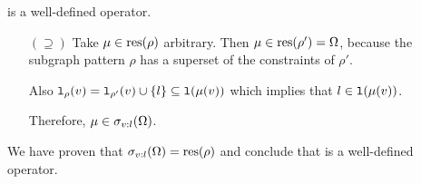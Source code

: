 \begin{definition}
\begin{proofof}{ is a well-defined operator.}
\begin{itemize}
\begin{enumerate}[(1)]
      \item %
        Fulfilled, because $\lambda_\rho = \lambda_{\rho'}$ and
        $\mu \in \result(\rho')$.
        
      \item %
        First of all, by definition $\{l\} \subseteq \nlabel(\mu(v))$.
        Also $\nlabel_{\rho'}(v) \subseteq \nlabel(\mu(v))$, because
        $\mu \in \Omega$ and $\Omega$ is a query result.
        Therefore, $\nlabel_\rho(v) = \{l\} \union \nlabel_{\rho'}(v)
                                    \subseteq \nlabel(\mu(v))$
      
      \item %
        Fulfilled, because $\rtype_\rho = \rtype_{\rho'}$ and
        $\mu \in \result(\rho')$.
        
      \item %
        Fulfilled, because and $\rpairs_\rho = \rpairs_{\rho'}$ and
        $\mu \in \result(\rho')$.
    \end{enumerate}
    
    As a result, $\mu \in \result(\rho)$.

  \item[$(\supseteq)$]
    Take $\mu \in \result(\rho)$ arbitrary.
    Then $\mu \in \text{res}(\rho') = \Omega$, because the subgraph pattern $\rho$
    has a superset of the constraints of $\rho'$.
    
    Also $\texttt{l}_\rho(v) = \texttt{l}_{\rho'}(v) \cup \{l\}
                          \subseteq \texttt{l}(\mu(v))$
    which implies that $l \in \texttt{l}(\mu(v))$.
    
    Therefore, $\mu \in \sigma_{v:l}(\Omega)$.
\end{itemize}

We have proven that $\sigma_{v:l}(\Omega) = \text{res}(\rho)$ and conclude that
 is a well-defined operator.
\end{proofof}
\end{definition}

